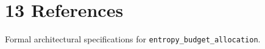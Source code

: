 \section{13 References}

Formal architectural specifications for \texttt{entropy_budget_allocation}.
